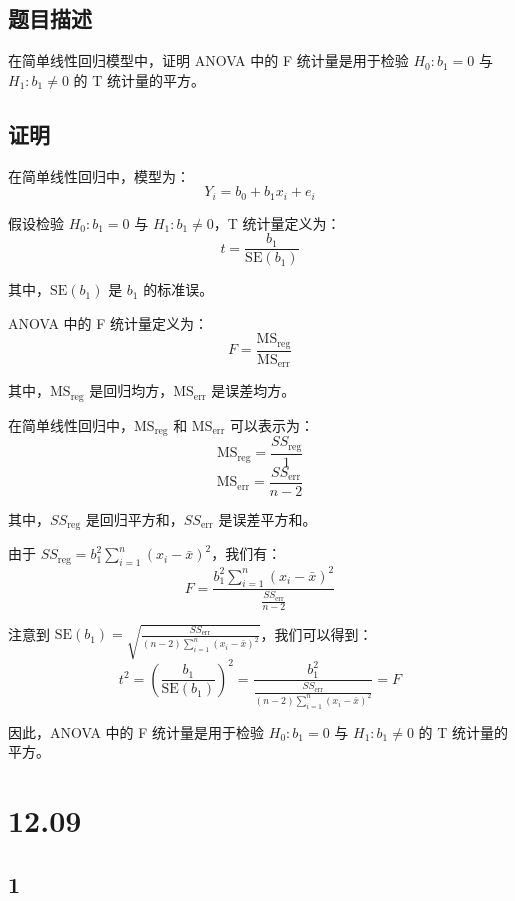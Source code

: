 \documentclass[UTF8]{report}
\theoremstyle{MyLineTheoremStyle} %
\theoremstyle{MyBlockTheoremStyle} %
\theoremstyle{MySubsubsectionStyle} %
\begin{document}
\subsection*{题目描述}

在简单线性回归模型中，证明 ANOVA 中的 F 统计量是用于检验 $H_0: b_1 = 0$ 与 $H_1: b_1 \neq 0$ 的 T 统计量的平方。


\subsection*{证明}

在简单线性回归中，模型为：
\[
Y_i = b_0 + b_1 x_i + e_i
\]

假设检验 $H_0: b_1 = 0$ 与 $H_1: b_1 \neq 0$，T 统计量定义为：
\[
t = \frac{b_1}{\text{SE}(b_1)}
\]

其中，$\text{SE}(b_1)$ 是 $b_1$ 的标准误。

ANOVA 中的 F 统计量定义为：
\[
F = \frac{\text{MS}_{\text{reg}}}{\text{MS}_{\text{err}}}
\]

其中，$\text{MS}_{\text{reg}}$ 是回归均方，$\text{MS}_{\text{err}}$ 是误差均方。

在简单线性回归中，$\text{MS}_{\text{reg}}$ 和 $\text{MS}_{\text{err}}$ 可以表示为：
\[
\text{MS}_{\text{reg}} = \frac{SS_{\text{reg}}}{1}
\]
\[
\text{MS}_{\text{err}} = \frac{SS_{\text{err}}}{n-2}
\]

其中，$SS_{\text{reg}}$ 是回归平方和，$SS_{\text{err}}$ 是误差平方和。

由于 $SS_{\text{reg}} = b_1^2 \sum_{i=1}^n (x_i - \bar{x})^2$，我们有：
\[
F = \frac{b_1^2 \sum_{i=1}^n (x_i - \bar{x})^2}{\frac{SS_{\text{err}}}{n-2}}
\]

注意到 $\text{SE}(b_1) = \sqrt{\frac{SS_{\text{err}}}{(n-2) \sum_{i=1}^n (x_i - \bar{x})^2}}$，我们可以得到：
\[
t^2 = \left(\frac{b_1}{\text{SE}(b_1)}\right)^2 = \frac{b_1^2}{\frac{SS_{\text{err}}}{(n-2) \sum_{i=1}^n (x_i - \bar{x})^2}} = F
\]

因此，ANOVA 中的 F 统计量是用于检验 $H_0: b_1 = 0$ 与 $H_1: b_1 \neq 0$ 的 T 统计量的平方。






\section{12.09}

\subsection{1}
\end{document}
